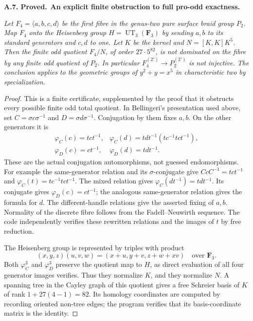 \documentclass[11pt,a4paper]{article}
\newcommand{\F}{\mathbf F}
\newenvironment{claim}[3]{\par\medskip\noindent\hypertarget{#1}{\textbf{#1. #2.}}\ \textbf{#3.}\par\nopagebreak\smallskip\begingroup\itshape}{\endgroup\par\smallskip}
\begin{document}
\begin{claim}{A.7}{Proved}{An explicit finite obstruction to full pro-odd exactness}
Let $F_4=\langle a,b,c,d\rangle$ be the first fibre in the genus-two
pure surface braid group $P_2$. Map $F_4$ onto the Heisenberg group
$H=\operatorname{UT}_3(\F_3)$ by sending $a,b$ to its standard
generators and $c,d$ to one. Let $K$ be the kernel and
$N=[K,K]K^5$. Then the finite odd quotient $F_4/N$, of order
$27\cdot5^{82}$, is not dominated on the fibre by any finite odd
quotient of $P_2$. In particular $F_4^{(2')}\to P_2^{(2')}$ is not
injective. The conclusion applies to the geometric groups of
$y^2+y=x^5$ in characteristic two by specialization.
\end{claim}
\begin{proof}
This is a finite certificate, supplemented by the proof that it
obstructs every possible finite odd total quotient. In Bellingeri's
presentation used above, set
$C=\sigma c\sigma^{-1}$ and $D=\sigma d\sigma^{-1}$.
Conjugation by them fixes $a,b$. On the other generators it is
\[
 \begin{array}{ll}
 \varphi_C(c)=tct^{-1},&
 \varphi_C(d)=tdt^{-1}(tc^{-1}tct^{-1}),\\
 \varphi_D(c)=ct^{-1},&
 \varphi_D(d)=tdt^{-1}.
 \end{array}                                                    \tag{CF.1}
\]
These are the actual conjugation automorphisms, not guessed
endomorphisms. For example the same-generator relation and its
$\sigma$-conjugate give
$CcC^{-1}=tct^{-1}$ and
$\varphi_C(t)=tc^{-1}tct^{-1}$. The mixed relation gives
$\varphi_C(dt^{-1})=tdt^{-1}$. Its conjugate gives
$\varphi_D(c)=ct^{-1}$; the analogous same-generator relation gives
the formula for $d$. The different-handle relations give the asserted
fixing of $a,b$. Normality of the discrete fibre follows from the
Fadell--Neuwirth sequence. The code independently verifies these
rewritten relations and the images of $t$ by free reduction.

The Heisenberg group is represented by triples with product
\[
 (x,y,z)(u,v,w)=(x+u,y+v,z+w+xv)\quad\text{over }\F_3.
\]
Both $\varphi_C^3$ and $\varphi_D^3$ preserve the quotient map to
$H$, as direct evaluation of all four generator images verifies.
Thus they normalize $K$, and they normalize $N$. A spanning tree in
the Cayley graph of this quotient gives a free Schreier basis of $K$
of rank $1+27(4-1)=82$. Its homology coordinates are computed by
recording oriented non-tree edges; the program verifies that its
basis-coordinate matrix is the identity.


\end{proof}
\end{document}

